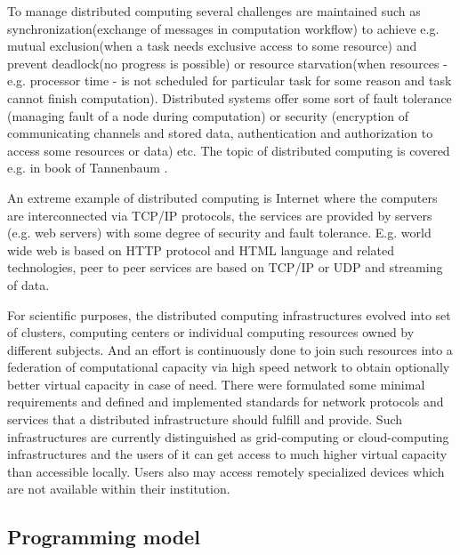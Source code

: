 To manage distributed computing several challenges are maintained such as synchronization(exchange of messages in computation workflow) to achieve e.g. mutual exclusion(when a task needs exclusive access to some resource) and prevent deadlock(no progress is possible) or resource starvation(when resources - e.g. processor time - is not scheduled for particular task for some reason and task cannot finish computation). Distributed systems offer some sort of fault tolerance (managing fault of a node during computation) or security (encryption of communicating channels and stored data, authentication and authorization to access some resources or data) etc. The topic of distributed computing is covered e.g. in book of Tannenbaum \cite{Tanenbaum2007}. 

An extreme example of distributed computing is Internet where the computers are interconnected via TCP/IP protocols, the services are provided by servers (e.g. web servers) with some degree of security and fault tolerance. E.g. world wide web is based on HTTP protocol and HTML language and related technologies, peer to peer services are based on TCP/IP or UDP and streaming of data.

For scientific purposes, the distributed computing infrastructures evolved into set of clusters, computing centers or individual computing resources owned by different subjects. And an effort is continuously done to join such resources into a federation of computational capacity via high speed network to obtain optionally better virtual capacity in case of need. There were formulated some minimal requirements and defined and implemented standards for network protocols and services that a distributed infrastructure should fulfill and provide. Such infrastructures are currently distinguished as grid-computing or cloud-computing infrastructures and the users of it can get access to much higher virtual capacity than accessible locally. Users also may access remotely specialized devices which are not available within their institution.

\subsection{Programming model}
\label{sec:distributedprogramming}

